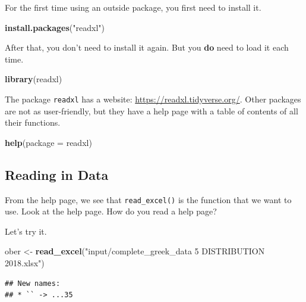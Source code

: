 \documentclass[]{book}
\newenvironment{Shaded}{\begin{snugshade}}{\end{snugshade}}
\newcommand{\DataTypeTok}[1]{\textcolor[rgb]{0.13,0.29,0.53}{#1}}
\newcommand{\KeywordTok}[1]{\textcolor[rgb]{0.13,0.29,0.53}{\textbf{#1}}}
\newcommand{\NormalTok}[1]{#1}
\newcommand{\StringTok}[1]{\textcolor[rgb]{0.31,0.60,0.02}{#1}}
\theoremstyle{definition}
\theoremstyle{definition}
\theoremstyle{definition}
\theoremstyle{remark}
\begin{document}
For the first time using an outside package, you first need to install it.

\begin{Shaded}
\begin{Highlighting}[]
\KeywordTok{install.packages}\NormalTok{(}\StringTok{"readxl"}\NormalTok{)}
\end{Highlighting}
\end{Shaded}

After that, you don't need to install it again. But you \textbf{do} need to load it each time.

\begin{Shaded}
\begin{Highlighting}[]
\KeywordTok{library}\NormalTok{(readxl)}
\end{Highlighting}
\end{Shaded}

The package \texttt{readxl} has a website: \url{https://readxl.tidyverse.org/}. Other packages are not as user-friendly, but they have a help page with a table of contents of all their functions.

\begin{Shaded}
\begin{Highlighting}[]
\KeywordTok{help}\NormalTok{(}\DataTypeTok{package =}\NormalTok{ readxl)}
\end{Highlighting}
\end{Shaded}

\hypertarget{reading-in-data}{%
\subsection{Reading in Data}\label{reading-in-data}}

From the help page, we see that \texttt{read\_excel()} is the function that we want to use. Look at the help page. How do you read a help page?

Let's try it.

\begin{Shaded}
\begin{Highlighting}[]
\NormalTok{ober <-}\StringTok{ }\KeywordTok{read_excel}\NormalTok{(}\StringTok{"input/complete_greek_data 5 DISTRIBUTION 2018.xlsx"}\NormalTok{)}
\end{Highlighting}
\end{Shaded}

\begin{verbatim}
## New names:
## * `` -> ...35
\end{verbatim}
\end{document}
